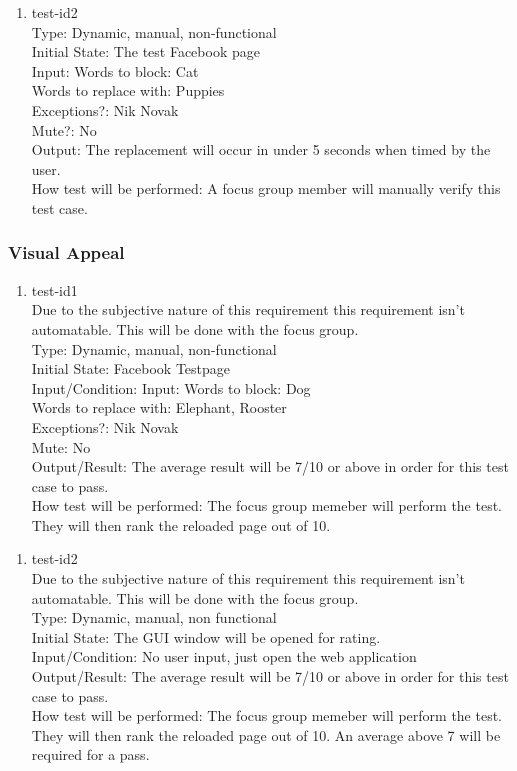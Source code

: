 \documentclass[12pt, titlepage]{article}
\begin{document}
\begin{enumerate}
\begin{enumerate}
\item{test-id2\\}
Type: Dynamic, manual, non-functional\\		
Initial State: The test Facebook page\\
Input:  Words to block: Cat \\
Words to replace with: Puppies \\
Exceptions?: Nik Novak \\
Mute?: No \\	
Output: The replacement will occur in under 5 seconds when timed by the user. \\	
How test will be performed: A focus group member will manually verify this test case.
\end{enumerate}
\subsubsection{Visual Appeal}
\begin{enumerate}
\item{test-id1\\}
Due to the subjective nature of this requirement this requirement isn't automatable. This will be done with the focus group. \\
Type: Dynamic, manual, non-functional \\
Initial State: Facebook Testpage \\
Input/Condition: Input: Words to block: Dog \\
Words to replace with: Elephant, Rooster \\
Exceptions?: Nik Novak\\
Mute: No\\					
Output/Result: The average result will be 7/10 or above in order for this test case to pass.\\					
How test will be performed: The focus group memeber will perform the test. They will then rank the reloaded page out of 10.
\end{enumerate}
\begin{enumerate}
\item{test-id2\\}
Due to the subjective nature of this requirement this requirement isn't automatable. This will be done with the focus group. \\
Type: Dynamic, manual, non functional \\
Initial State: The GUI window will be opened for rating.\\
Input/Condition: No user input, just open the web application \\
Output/Result: The average result will be 7/10 or above in order for this test case to pass. \\
How test will be performed: The focus group memeber will perform the test. They will then rank the reloaded page out of 10. An average above 7 will be required for a pass.
\end{enumerate}

\end{enumerate}
\end{document}
